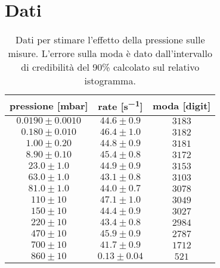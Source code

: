 \clearpage
\section{Dati}

\begin{table}[h]
\centering
\begin{tabular}{c|c|c}

pressione [mbar] & rate [\si{s^{-1}}] & moda [digit] \\
\hline
$ 0.0190 \pm 0.0010 $ & $ 44.6 \pm 0.9 $ & $ 3183 $ \\ 
$ 0.180 \pm 0.010 $ & $ 46.4 \pm 1.0 $ & $ 3182 $ \\ 
$ 1.00 \pm 0.20 $ & $ 44.8 \pm 0.9 $ & $ 3181 $ \\ 
$ 8.90 \pm 0.10 $ & $ 45.4 \pm 0.8 $ & $ 3172 $ \\ 
$ 23.0 \pm 1.0 $ & $ 44.9 \pm 0.9 $ & $ 3153 $ \\ 
$ 63.0 \pm 1.0 $ & $ 43.1 \pm 0.8 $ & $ 3103 $ \\ 
$ 81.0 \pm 1.0 $ & $ 44.0 \pm 0.7 $ & $ 3078 $ \\ 
$ 110 \pm 10 $ & $ 47.1 \pm 1.0 $ & $ 3049 $ \\ 
$ 150 \pm 10 $ & $ 44.4 \pm 0.9 $ & $ 3027 $ \\ 
$ 220 \pm 10 $ & $ 43.4 \pm 0.8 $ & $ 2984 $ \\ 
$ 470 \pm 10 $ & $ 45.9 \pm 0.9 $ & $ 2787 $ \\ 
$ 700 \pm 10 $ & $ 41.7 \pm 0.9 $ & $ 1712 $ \\ 
$ 860 \pm 10 $ & $ 0.13 \pm 0.04 $ & $ 521 $ \\ 

\end{tabular}
\caption{Dati per stimare l'effetto della pressione sulle misure. L'errore sulla moda è dato dall'intervallo di credibilità del 90\% calcolato sul relativo istogramma.}
\label{tab:press}
\end{table}


